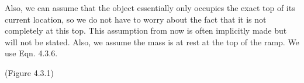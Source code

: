 \documentclass{article}[gray]
\numberwithin{equation}{subsection}
\begin{document}
Also, we can assume that the object essentially only occupies the exact top of its current location, so we do not have to worry about the fact that it is not completely at this top. This assumption from now is often implicitly made but will not be stated. Also, we assume the mass is at rest at the top of the ramp. We use Eqn. 4.3.6. 
\newline
{}
\newline
\begin{center}
(Figure 4.3.1)
\end{center}
\end{document}
